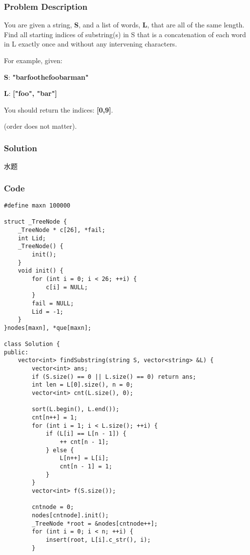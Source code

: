 \documentclass[courier]{article}
\begin{document}
\begin{CJK*}{UTF8}{gkai}
\subsubsection*{Problem Description}
You are given a string, \textbf{S}, and a list of words, \textbf{L}, that are all of the same length. Find all starting indices of substring(s) in S that is a concatenation of each word in L exactly once and without any intervening characters.

For example, given:


\textbf{S}: \textbf{"barfoothefoobarman"}


\textbf{L}: \textbf{["foo", "bar"]}

You should return the indices: \textbf{[0,9]}.


(order does not matter).



\subsubsection*{Solution}
水题

\subsubsection*{Code}
\begin{lstlisting}
#define maxn 100000

struct _TreeNode {
    _TreeNode * c[26], *fail;
    int Lid;
    _TreeNode() {
        init();
    }
    void init() {
        for (int i = 0; i < 26; ++i) {
            c[i] = NULL;
        }
        fail = NULL;
        Lid = -1;
    }
}nodes[maxn], *que[maxn];

class Solution {
public:
    vector<int> findSubstring(string S, vector<string> &L) {
        vector<int> ans;
        if (S.size() == 0 || L.size() == 0) return ans;
        int len = L[0].size(), n = 0;
        vector<int> cnt(L.size(), 0);
        
        sort(L.begin(), L.end());
        cnt[n++] = 1;
        for (int i = 1; i < L.size(); ++i) {
            if (L[i] == L[n - 1]) {
                ++ cnt[n - 1];
            } else {
                L[n++] = L[i];
                cnt[n - 1] = 1;
            }
        }
        vector<int> f(S.size());
        
        cntnode = 0;
        nodes[cntnode].init();
        _TreeNode *root = &nodes[cntnode++];
        for (int i = 0; i < n; ++i) {
            insert(root, L[i].c_str(), i);
        }
        

\end{lstlisting}
\end{CJK*}
\end{document}
